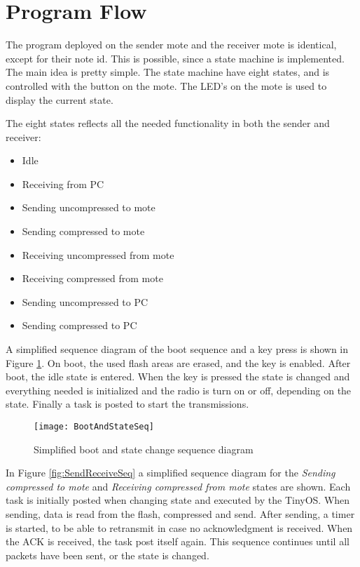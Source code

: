 \section{Program Flow}
The program deployed on the sender mote and the receiver mote is identical, except for their note id. This is possible, since a state machine is implemented. The main idea is pretty simple. The state machine have eight states, and is controlled with the button on the mote. The LED's on the mote is used to display the current state.


The eight states reflects all the needed functionality in both the sender and receiver:
\begin{itemize}
\item Idle
\item Receiving from PC
\item Sending uncompressed to mote
\item Sending compressed to mote
\item Receiving uncompressed from mote
\item Receiving compressed from mote
\item Sending uncompressed to PC
\item Sending compressed to PC
\end{itemize}

A simplified sequence diagram of the boot sequence and a key press is shown in Figure \ref{fig:BootAndState}. On boot, the used flash areas are erased, and the key is enabled. After boot, the idle state is entered. When the key is pressed the state is changed and everything needed is initialized and the radio is turn on or off, depending on the state. Finally a task is posted to start the transmissions.

\begin{figure}[H]
\centering
\texttt{[image: BootAndStateSeq]}
\caption{Simplified boot and state change sequence diagram}
\label{fig:BootAndState}
\end{figure}

In Figure \ref{fig:SendReceiveSeq} a simplified sequence diagram for the \emph{Sending compressed to mote} and \emph{Receiving compressed from mote} states are shown. Each task is initially posted when changing state and executed by the TinyOS. When sending, data is read from the flash, compressed and send. After sending, a timer is started, to be able to retransmit in case no acknowledgment is received. When the ACK is received, the task post itself again. This sequence continues until all packets have been sent, or the state is changed.

